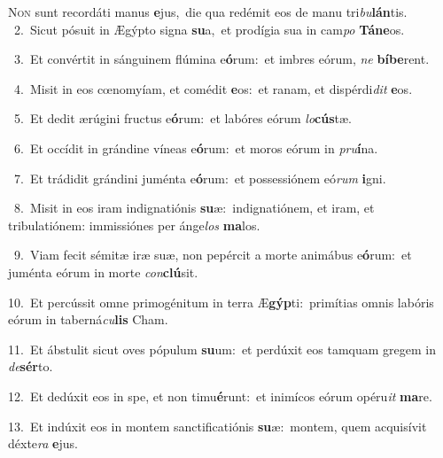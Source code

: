 \lettrine{\initial\textcolor{\initialcolor}{N}}{on} sunt recordáti manus \textbf{e}\-jus,~\star die qua redémit eos de manu tri\-\textit{bu}\-\textbf{lán}tis.\\
{\numbfont\textcolor{\numbcolor}{~2.}}~Sicut pósuit in Ægýpto signa \textbf{su}\-a,~\star et prodígia sua in cam\textit{po} \textbf{Tá}\-\textbf{ne}os.\par
{\numbfont\textcolor{\numbcolor}{~3.}}~Et convértit in sánguinem flúmina e\-\textbf{ó}\-rum:~\star et imbres eórum, \textit{ne} \textbf{bí}\-\textbf{be}rent.\par
{\numbfont\textcolor{\numbcolor}{~4.}}~Misit in eos cœnomyíam, et comédit \textbf{e}\-os:~\star et ranam, et dispérdi\textit{dit} \textbf{e}\-os.\par
{\numbfont\textcolor{\numbcolor}{~5.}}~Et dedit ærúgini fructus e\-\textbf{ó}\-rum:~\star et labóres eórum \textit{lo}\-\textbf{cús}tæ.\par
{\numbfont\textcolor{\numbcolor}{~6.}}~Et occídit in grándine víneas e\-\textbf{ó}\-rum:~\star et moros eórum in \textit{pru}\-\textbf{í}na.\par
{\numbfont\textcolor{\numbcolor}{~7.}}~Et trádidit grándini juménta e\-\textbf{ó}\-rum:~\star et possessiónem eó\textit{rum} \textbf{i}\-gni.\par
{\numbfont\textcolor{\numbcolor}{~8.}}~Misit in eos iram indignatiónis \textbf{su}\-æ:~\star indignatiónem, et iram, et tribulatiónem: immissiónes per ánge\textit{los} \textbf{ma}\-los.\par
{\numbfont\textcolor{\numbcolor}{~9.}}~Viam fecit sémitæ iræ suæ, non pepércit a morte animábus e\-\textbf{ó}\-rum:~\star et juménta eórum in morte \textit{con}\-\textbf{clú}sit.\par
{\numbfont\textcolor{\numbcolor}{10.}}~Et percússit omne primogénitum in terra Æ\-\textbf{gýp}\-ti:~\star primítias omnis labóris eórum in taberná\-\textit{cu}\-\textbf{lis} Cham.\par
{\numbfont\textcolor{\numbcolor}{11.}}~Et ábstulit sicut oves pópulum \textbf{su}\-um:~\star et perdúxit eos tamquam gregem in \textit{de}\-\textbf{sér}to.\par
{\numbfont\textcolor{\numbcolor}{12.}}~Et dedúxit eos in spe, et non timu\-\textbf{é}\-runt:~\star et inimícos eórum opéru\textit{it} \textbf{ma}\-re.\par
{\numbfont\textcolor{\numbcolor}{13.}}~Et indúxit eos in montem sanctificatiónis \textbf{su}\-æ:~\star montem, quem acquisívit déxte\textit{ra} \textbf{e}\-jus.\par

